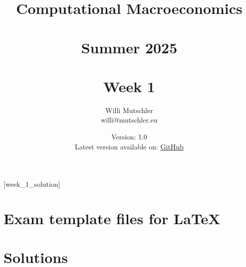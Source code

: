 
\newif\ifDisplaySolutions\DisplaySolutionstrue%


\title{Computational Macroeconomics\\~\\Summer 2025\\~\\Week 1}
\author{Willi Mutschler\\willi@mutschler.eu}
\date{Version: 1.0\\Latest version available on: \href{https://github.com/wmutschl/Computational-Macroeconomics/releases/latest/download/week_1.pdf}{GitHub}}
\maketitle\thispagestyle{empty}

\newpage
{}[week_1_solution]
\tableofcontents\thispagestyle{empty}\newpage

\setcounter{page}{1}
\newpage
\newpage
\newpage
\newpage
\newpage
\printbibliography%
\newpage
\appendix
\section{Exam template files for \LaTeX}





\ifDisplaySolutions%
\newpage
\section{Solutions}

\fi
